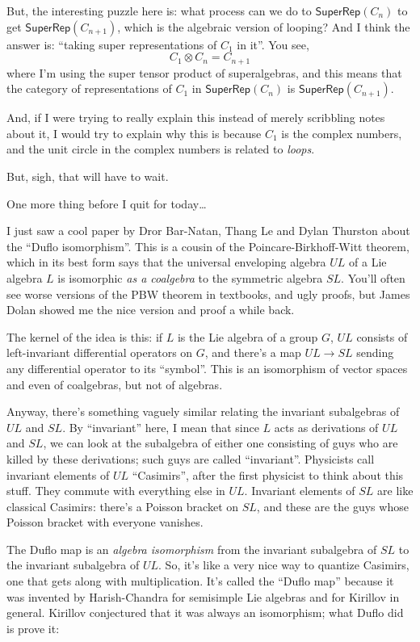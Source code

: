 \documentclass{article}
\begin{document}
But, the interesting puzzle here is: what process can we do to
\(\mathsf{SuperRep}(C_n)\) to get \(\mathsf{SuperRep}(C_{n+1})\), which
is the algebraic version of looping? And I think the answer is: ``taking
super representations of \(C_1\) in it''. You see,
\[C_1 \otimes C_n = C_{n+1}\] where I'm using the super tensor product
of superalgebras, and this means that the category of representations of
\(C_1\) in \(\mathsf{SuperRep}(C_n)\) is \(\mathsf{SuperRep}(C_{n+1})\).

And, if I were trying to really explain this instead of merely
scribbling notes about it, I would try to explain why this is because
\(C_1\) is the complex numbers, and the unit circle in the complex
numbers is related to \emph{loops}.

But, sigh, that will have to wait.

One more thing before I quit for today\ldots{}

I just saw a cool paper by Dror Bar-Natan, Thang Le and Dylan Thurston
about the ``Duflo isomorphism''. This is a cousin of the
Poincare-Birkhoff-Witt theorem, which in its best form says that the
universal enveloping algebra \(UL\) of a Lie algebra \(L\) is isomorphic
\emph{as a coalgebra} to the symmetric algebra \(SL\). You'll often see
worse versions of the PBW theorem in textbooks, and ugly proofs, but
James Dolan showed me the nice version and proof a while back.

The kernel of the idea is this: if \(L\) is the Lie algebra of a group
\(G\), \(UL\) consists of left-invariant differential operators on
\(G\), and there's a map \(UL \to SL\) sending any differential operator
to its ``symbol''. This is an isomorphism of vector spaces and even of
coalgebras, but not of algebras.

Anyway, there's something vaguely similar relating the invariant
subalgebras of \(UL\) and \(SL\). By ``invariant'' here, I mean that
since \(L\) acts as derivations of \(UL\) and \(SL\), we can look at the
subalgebra of either one consisting of guys who are killed by these
derivations; such guys are called ``invariant''. Physicists call
invariant elements of \(UL\) ``Casimirs'', after the first physicist to
think about this stuff. They commute with everything else in \(UL\).
Invariant elements of \(SL\) are like classical Casimirs: there's a
Poisson bracket on \(SL\), and these are the guys whose Poisson bracket
with everyone vanishes.

The Duflo map is an \emph{algebra isomorphism} from the invariant
subalgebra of \(SL\) to the invariant subalgebra of \(UL\). So, it's
like a very nice way to quantize Casimirs, one that gets along with
multiplication. It's called the ``Duflo map'' because it was invented by
Harish-Chandra for semisimple Lie algebras and for Kirillov in general.
Kirillov conjectured that it was always an isomorphism; what Duflo did
is prove it:
\end{document}
